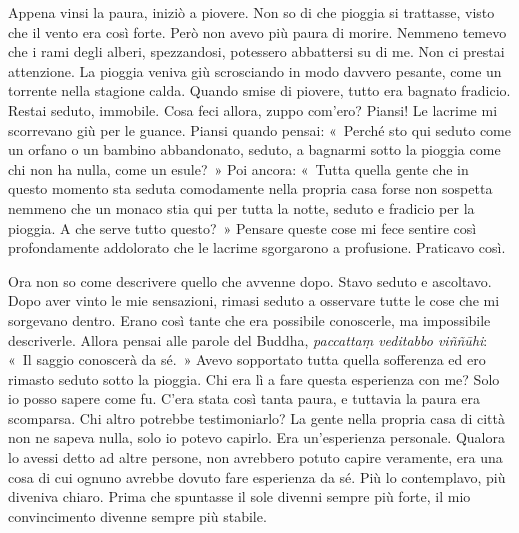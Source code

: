 Appena vinsi la paura, iniziò a piovere. Non so di che pioggia si
trattasse, visto che il vento era così forte. Però non avevo più paura
di morire. Nemmeno temevo che i rami degli alberi, spezzandosi,
potessero abbattersi su di me. Non ci prestai attenzione. La pioggia
veniva giù scrosciando in modo davvero pesante, come un torrente nella
stagione calda. Quando smise di piovere, tutto era bagnato fradicio.
Restai seduto, immobile. Cosa feci allora, zuppo com'ero? Piansi! Le
lacrime mi scorrevano giù per le guance. Piansi quando pensai: «~Perché
sto qui seduto come un orfano o un bambino abbandonato, seduto, a
bagnarmi sotto la pioggia come chi non ha nulla, come un esule?~» Poi
ancora: «~Tutta quella gente che in questo momento sta seduta
comodamente nella propria casa forse non sospetta nemmeno che un monaco
stia qui per tutta la notte, seduto e fradicio per la pioggia. A che
serve tutto questo?~» Pensare queste cose mi fece sentire così
profondamente addolorato che le lacrime sgorgarono a profusione.
Praticavo così.

Ora non so come descrivere quello che avvenne dopo. Stavo seduto e
ascoltavo. Dopo aver vinto le mie sensazioni, rimasi seduto a osservare
tutte le cose che mi sorgevano dentro. Erano così tante che era
possibile conoscerle, ma impossibile descriverle. Allora pensai alle
parole del Buddha, \emph{paccattaṃ veditabbo viññūhi}: «~Il saggio
conoscerà da sé.~» Avevo sopportato tutta quella sofferenza ed ero
rimasto seduto sotto la pioggia. Chi era lì a fare questa esperienza con
me? Solo io posso sapere come fu. C'era stata così tanta paura, e
tuttavia la paura era scomparsa. Chi altro potrebbe testimoniarlo? La
gente nella propria casa di città non ne sapeva nulla, solo io potevo
capirlo. Era un'esperienza personale. Qualora lo avessi detto ad altre
persone, non avrebbero potuto capire veramente, era una cosa di cui
ognuno avrebbe dovuto fare esperienza da sé. Più lo contemplavo, più
diveniva chiaro. Prima che spuntasse il sole divenni sempre più forte,
il mio convincimento divenne sempre più stabile.


